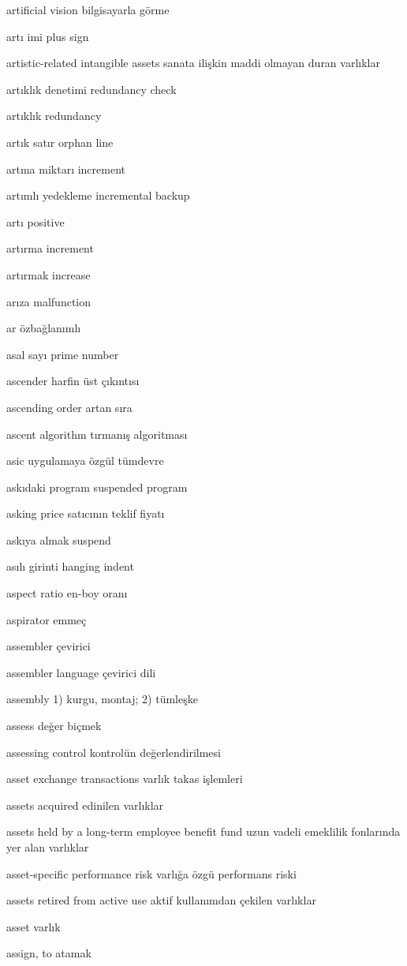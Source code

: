 \documentclass[12pt,fleqn]{article}\usepackage{../../common}
\begin{document}
artificial vision bilgisayarla görme

artı imi plus sign

artistic-related intangible assets sanata ilişkin maddi olmayan duran varlıklar

artıklık denetimi redundancy check

artıklık redundancy

artık satır orphan line

artma miktarı increment

artımlı yedekleme incremental backup

artı positive

artırma increment

artırmak increase

arıza malfunction

ar özbağlanımlı

asal sayı prime number

ascender harfin üst çıkıntısı

ascending order artan sıra

ascent algorithm tırmanış algoritması

asic uygulamaya özgül tümdevre

askıdaki program suspended program

asking price satıcının teklif fiyatı

askıya almak suspend

asılı girinti hanging indent

aspect ratio en-boy oranı

aspirator emmeç

assembler çevirici

assembler language çevirici dili

assembly 1) kurgu, montaj; 2) tümleşke

assess değer biçmek

assessing control kontrolün değerlendirilmesi

asset exchange transactions varlık takas işlemleri

assets acquired edinilen varlıklar

assets held by a long-term employee benefit fund uzun vadeli emeklilik fonlarında yer alan varlıklar

asset-specific performance risk varlığa özgü performans riski

assets retired from active use aktif kullanımdan çekilen varlıklar

asset varlık

assign, to atamak
\end{document}
